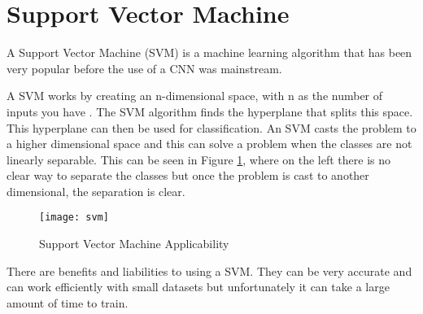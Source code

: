 \section{Support Vector Machine}
A Support Vector Machine (SVM) is a machine learning algorithm that has been
very popular before the use of a CNN was mainstream.

A SVM works by creating an n-dimensional space, with n as the number of
inputs you have \textcite{svm}. The SVM algorithm finds the hyperplane that splits this space.
This hyperplane can then be used for classification. 
An SVM casts the problem to a higher dimensional space and this can solve a problem when the classes are not linearly separable.
This can be seen in Figure \ref{fig:svm}, where on the left there is no clear way to separate the classes but once the problem is cast to another dimensional, the separation is clear.

\begin{figure}[h]
    \texttt{[image: svm]}
    \caption{Support Vector Machine Applicability}
    \label{fig:svm}
\end{figure}

There are benefits and liabilities to using a SVM.
They can be very accurate and can work efficiently with small datasets but unfortunately it can take a large amount of time to train. 